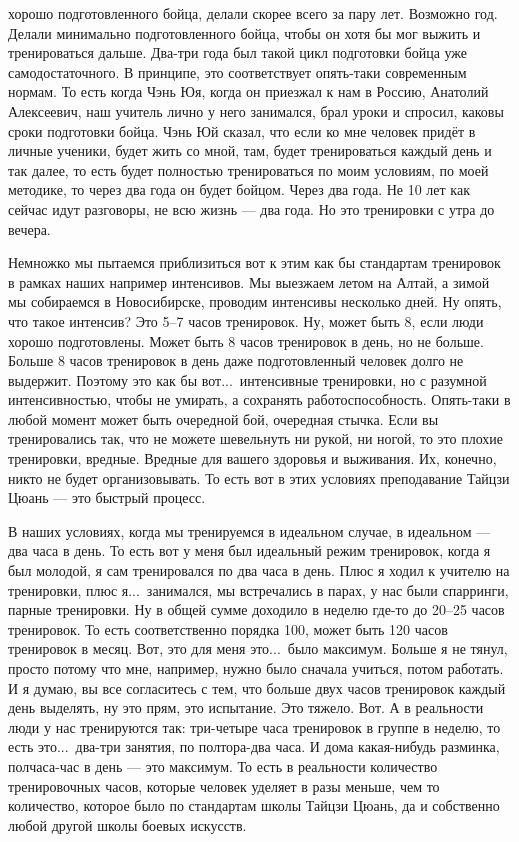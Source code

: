 хорошо подготовленного бойца, делали скорее всего за 
пару лет.  Возможно год. Делали минимально 
подготовленного бойца, чтобы он хотя бы мог выжить и 
тренироваться дальше.  Два-три года был такой цикл 
подготовки бойца уже самодостаточного. В принципе,  
это соответствует опять-таки современным нормам. То 
есть когда Чэнь Юя, когда он приезжал к нам в Россию, 
Анатолий Алексеевич, наш учитель лично у него 
занимался, брал уроки и спросил, каковы сроки 
подготовки бойца. Чэнь Юй сказал, что если ко мне 
человек придёт в личные ученики, будет жить со мной, 
там, будет тренироваться каждый день и так далее, то 
есть будет полностью тренироваться по моим условиям, 
по моей методике, то через два года он будет бойцом. 
Через два года. Не 10 лет как сейчас идут разговоры, не 
всю жизнь --- два года. Но это тренировки с утра до вечера.

Немножко мы пытаемся приблизиться 
вот к этим как бы стандартам тренировок в рамках наших 
например интенсивов. Мы выезжаем летом на Алтай, а 
зимой мы собираемся в Новосибирске, проводим интенсивы 
несколько дней. Ну опять, что такое интенсив? Это 5--7 
часов тренировок. Ну, может быть 8, если люди хорошо 
подготовлены. Может быть 8 часов тренировок в день, но 
не больше. Больше 8 часов тренировок в день даже 
подготовленный человек долго не выдержит. Поэтому это 
как бы вот...\ интенсивные тренировки, но с разумной 
интенсивностью, чтобы не умирать, а сохранять 
работоспособность. Опять-таки в любой момент может 
быть очередной бой, очередная стычка. Если вы 
тренировались так, что не можете шевельнуть ни рукой, 
ни ногой, то это плохие тренировки, вредные. Вредные 
для вашего здоровья и выживания. Их, конечно, никто не 
будет организовывать.
То есть вот в этих условиях 
преподавание Тайцзи Цюань --- это быстрый процесс.

В 
наших условиях, когда мы тренируемся в идеальном 
случае, в идеальном --- два часа в день. То есть вот у 
меня был идеальный режим тренировок, когда я был 
молодой, я сам тренировался по два часа в день. Плюс я 
ходил к учителю на тренировки, плюс я...\ занимался, мы 
встречались в парах, у нас были спарринги, парные 
тренировки. Ну в общей сумме доходило в неделю где-то 
до 20--25 часов тренировок. То есть соответственно 
порядка 100, может быть 120 часов тренировок в месяц. Вот, 
это для меня это...\ было максимум. Больше я не тянул, 
просто потому что мне, например, нужно было сначала 
учиться, потом работать. И я думаю, вы все согласитесь 
с тем, что больше двух часов тренировок каждый день 
выделять, ну это прям, это испытание. Это тяжело.  Вот. А 
в реальности люди у нас тренируются так: три-четыре 
часа тренировок в группе в неделю, то есть это...\ 
два-три занятия, по полтора-два часа. И дома 
какая-нибудь разминка, полчаса-час в день --- это 
максимум. То есть в реальности количество 
тренировочных часов,  которые человек уделяет в разы 
меньше, чем то количество, которое было по стандартам школы 
Тайцзи Цюань, да и собственно любой другой школы боевых 
искусств.

